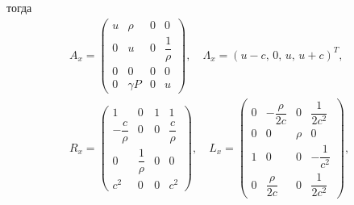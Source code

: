 \documentclass[12pt,a4paper]{article}
\begin{document}
        \noindent тогда 
        \begin{equation}
            \label{eigen2d:x}
            \begin{array}{c}
                A_x = \begin{pmatrix}
                    u & \rho & 0 & 0 \\
                    0 & u & 0 & \dfrac{1}{\rho} \\[2mm]
                    0 & 0 & 0 & 0 \\
                    0 & \gamma P & 0 & u
                \end{pmatrix}, \quad 
                \Lambda_x = (u - c,\, 0,\, u,\, u + c)^T, \\[1em]
                R_x = \begin{pmatrix}
                    1 & 0 & 1 & 1 \\
                    -\dfrac{c}{\rho} & 0 & 0 & \dfrac{c}{\rho} \\
                    0 & \dfrac{1}{\rho} & 0 & 0 \\[2mm]
                    c^2 & 0 & 0 & c^2
                \end{pmatrix}, \quad 
                L_x = \begin{pmatrix}
                    0 & -\dfrac{\rho}{2c} & 0 & \dfrac{1}{2c^2} \\
                    0 & 0 & \rho & 0 \\
                    1 & 0 & 0 & -\dfrac{1}{c^2} \\[3mm]
                    0 & \dfrac{\rho}{2c} & 0 & \dfrac{1}{2c^2}
                \end{pmatrix}, \\[3mm]
            \end{array}
        \end{equation}
\end{document}
